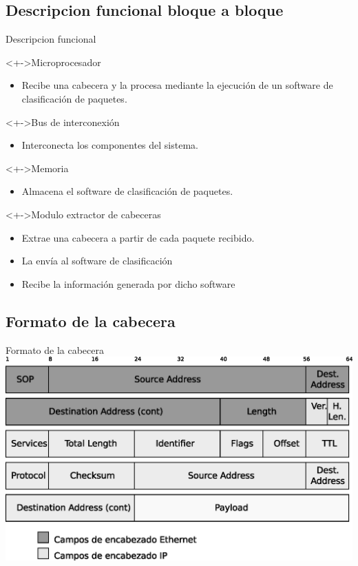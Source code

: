 \documentclass[xcolor=dvipsnames]{beamer}
\begin{document}
\subsection{Descripcion funcional bloque a bloque}
\begin{frame}{Descripcion funcional}
\begin{block}<+->{Microprocesador}   
    \begin{itemize}
      \scriptsize
     	\item Recibe una cabecera y la procesa mediante la ejecución de un software de clasificación de paquetes.
    \end{itemize}
  \end{block}
  \begin{block}<+->{Bus de interconexión}   
    \begin{itemize}
      \scriptsize
     	\item Interconecta los componentes del sistema. 
    \end{itemize}
  \end{block}
\begin{block}<+->{Memoria}   
    \begin{itemize}
      \scriptsize
     	\item Almacena el software de clasificación de paquetes.
    \end{itemize}
  \end{block}
  \begin{block}<+->{Modulo extractor de cabeceras}   
    \begin{itemize}
      \scriptsize
     	\item Extrae una cabecera a partir de cada paquete recibido.
	\item La envía al software de clasificación
	\item Recibe la información generada por dicho software
    \end{itemize}
  \end{block}
\end{frame}

\subsection{Formato de la cabecera}
\begin{frame}{Formato de la cabecera}
 \center 
\includegraphics[scale=0.55]{figures/cabecera.eps}
\end{frame}
\end{document}
